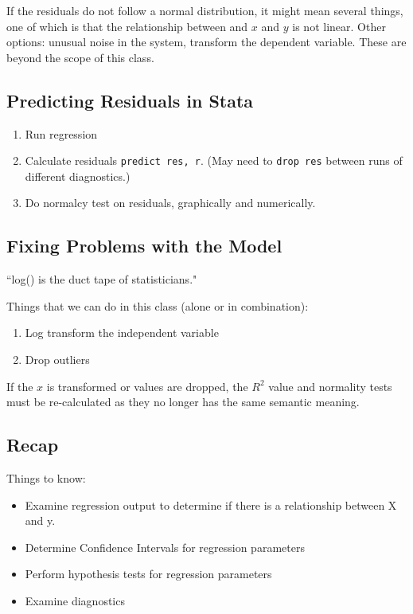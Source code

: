 \documentclass[11pt, oneside]{article}   	%
\begin{document}
If the residuals do not follow a normal distribution, it might mean several things, one of which is that the relationship between and $x$ and $y$ is not linear. Other options: unusual noise in the system, transform the dependent variable. These are beyond the scope of this class.



\subsection{Predicting Residuals in Stata}

\begin{enumerate}
\item{Run regression}
\item{Calculate residuals \texttt{predict res, r}. (May need to \texttt{drop res} between runs of different diagnostics.)}
\item{Do normalcy test on residuals, graphically and numerically.}
\end{enumerate}

\subsection{Fixing Problems with the Model}

``log() is the duct tape of statisticians."

Things that we can do in this class (alone or in combination):
\begin{enumerate}
\item{Log transform the independent variable}
\item{Drop outliers}
\end{enumerate}

If the $x$ is transformed or values are dropped, the $R^2$ value and normality tests must be re-calculated as they no longer has the same semantic meaning. 

\subsection{Recap}

Things to know:

\begin{itemize}
\item{Examine regression output to determine if there is a relationship between X and y.}
\item{Determine Confidence Intervals for regression parameters}
\item{Perform hypothesis tests for regression parameters}
\item{Examine diagnostics}
\end{itemize}
\end{document}
